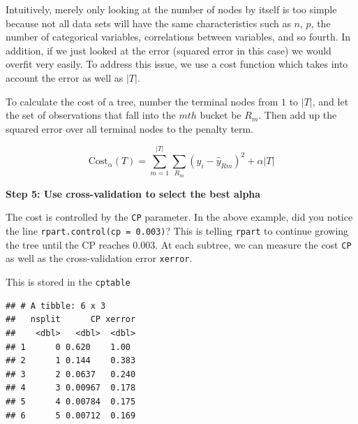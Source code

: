 \documentclass[openany]{book}
\newenvironment{Shaded}{\begin{snugshade}}{\end{snugshade}}
\newcommand{\DataTypeTok}[1]{\textcolor[rgb]{0.13,0.29,0.53}{#1}}
\newcommand{\FloatTok}[1]{\textcolor[rgb]{0.00,0.00,0.81}{#1}}
\newcommand{\KeywordTok}[1]{\textcolor[rgb]{0.13,0.29,0.53}{\textbf{#1}}}
\newcommand{\NormalTok}[1]{#1}
\newcommand{\OperatorTok}[1]{\textcolor[rgb]{0.81,0.36,0.00}{\textbf{#1}}}
\newcommand{\StringTok}[1]{\textcolor[rgb]{0.31,0.60,0.02}{#1}}
\begin{document}
Intuitively, merely only looking at the number of nodes by itself is too simple because not all data sets will have the same characteristics such as \(n\), \(p\), the number of categorical variables, correlations between variables, and so fourth. In addition, if we just looked at the error (squared error in this case) we would overfit very easily. To address this issue, we use a cost function which takes into account the error as well as \(|T|\).

To calculate the cost of a tree, number the terminal nodes from \(1\) to \(|T|\), and let the set of observations that fall into the \(mth\) bucket be \(R_m\). Then add up the squared error over all terminal nodes to the penalty term.

\[
\text{Cost}_\alpha(T) = \sum_{m=1}^{|T|} \sum_{R_m}(y_i - \hat{y}_{Rm})^2 + \alpha |T|
\]

\textbf{Step 5: Use cross-validation to select the best alpha}

The cost is controlled by the \texttt{CP} parameter. In the above example, did you notice the line \texttt{rpart.control(cp\ =\ 0.003)}? This is telling \texttt{rpart} to continue growing the tree until the CP reaches 0.003. At each subtree, we can measure the cost \texttt{CP} as well as the cross-validation error \texttt{xerror}.

This is stored in the \texttt{cptable}

\begin{Shaded}
\end{Shaded}

\begin{verbatim}
## # A tibble: 6 x 3
##   nsplit      CP xerror
##    <dbl>   <dbl>  <dbl>
## 1      0 0.620    1.00 
## 2      1 0.144    0.383
## 3      2 0.0637   0.240
## 4      3 0.00967  0.178
## 5      4 0.00784  0.175
## 6      5 0.00712  0.169
\end{verbatim}
\end{document}
